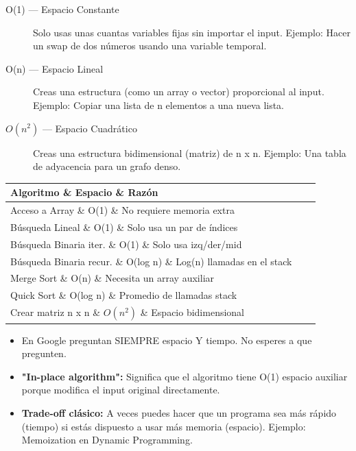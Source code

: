\begin{dsacomofunciona}

\begin{description}
    \item[O(1) --- Espacio Constante] Solo usas unas cuantas variables fijas sin importar el input. Ejemplo: Hacer un swap de dos números usando una variable temporal.
    \item[O(n) --- Espacio Lineal] Creas una estructura (como un array o vector) proporcional al input. Ejemplo: Copiar una lista de n elementos a una nueva lista.
    \item[$O(n^2)$ --- Espacio Cuadrático] Creas una estructura bidimensional (matriz) de n x n. Ejemplo: Una tabla de adyacencia para un grafo denso.
\end{description}

\end{dsacomofunciona}

\begin{dsacomplejidad}

\begin{tabular}{|l|l|l|}
\hline
Algoritmo \& Espacio \& Razón \\
\hline
Acceso a Array \& O(1) \& No requiere memoria extra \\
Búsqueda Lineal \& O(1) \& Solo usa un par de índices \\
Búsqueda Binaria iter. \& O(1) \& Solo usa izq/der/mid \\
Búsqueda Binaria recur. \& O(log n) \& Log(n) llamadas en el stack \\
Merge Sort \& O(n) \& Necesita un array auxiliar \\
Quick Sort \& O(log n) \& Promedio de llamadas stack \\
Crear matriz n x n \& $O(n^2)$ \& Espacio bidimensional \\
\hline
\end{tabular}

\end{dsacomplejidad}

\begin{dsaentrevistas}

\begin{itemize}
    \item En Google preguntan SIEMPRE espacio Y tiempo. No esperes a que pregunten.
    \item \textbf{"In-place algorithm":} Significa que el algoritmo tiene O(1) espacio auxiliar porque modifica el input original directamente.
    \item \textbf{Trade-off clásico:} A veces puedes hacer que un programa sea más rápido (tiempo) si estás dispuesto a usar más memoria (espacio). Ejemplo: Memoization en Dynamic Programming.
\end{itemize}

\end{dsaentrevistas}

